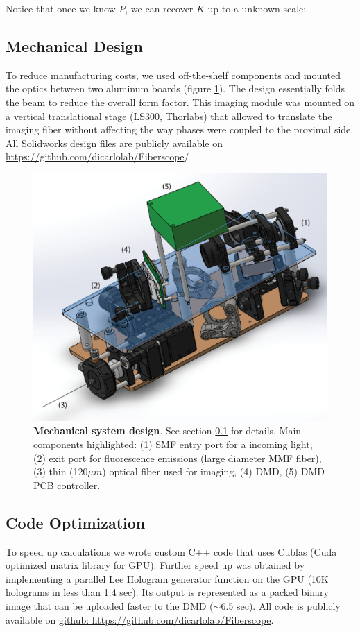 \documentclass[10pt]{article}
\begin{document}
 Notice that once we know $P$, we can recover $K$ up to a unknown scale:
 
\subsection{Mechanical Design} \label{mechanical_design}
To reduce manufacturing costs, we used off-the-shelf components and mounted the optics between two aluminum boards (figure \ref{fig:figure13}). The design essentially folds the beam to reduce the overall form factor. This imaging module was mounted on a vertical translational stage (LS300, Thorlabs) that allowed to translate the imaging fiber without affecting the way phases were coupled to the proximal side. All Solidworks design files are publicly available on \url{https://github.com/dicarlolab/Fiberscope}/

\begin{figure}[ht!]
\centering\includegraphics[width=15cm]{figure13}
\caption{\textbf{Mechanical system design}. See section \ref{mechanical_design} for details. Main components highlighted: (1) SMF entry port for a incoming light, (2) exit port for fluorescence emissions (large diameter MMF fiber), (3) thin (120$\mu m$) optical fiber used for imaging, (4) DMD, (5) DMD PCB controller. }
\label{fig:figure13}
\end{figure}

\subsection{Code Optimization}
To speed up calculations we wrote custom C++ code that uses Cublas (Cuda optimized matrix library for GPU). Further speed up was obtained by implementing a parallel Lee Hologram generator function on the GPU (10K holograms in less than 1.4 sec). Its output is represented as a packed binary image that can be uploaded faster to the DMD ($\sim$6.5 sec). All code is publicly available on \url{github: https://github.com/dicarlolab/Fiberscope}.
\end{document}
